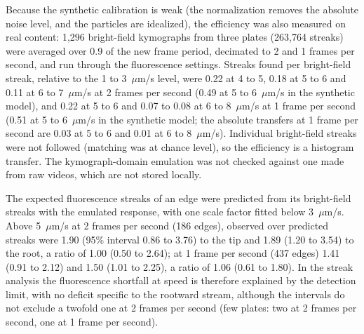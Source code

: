 Because the synthetic calibration is weak (the normalization removes the absolute noise level, and the particles are idealized), the efficiency was also measured on real content: 1,296 bright-field kymographs from three plates (263,764 streaks) were averaged over 0.9 of the new frame period, decimated to 2 and 1 frames per second, and run through the fluorescence settings.
Streaks found per bright-field streak, relative to the 1 to 3~$\mu$m/s level, were 0.22 at 4 to 5, 0.18 at 5 to 6 and 0.11 at 6 to 7~$\mu$m/s at 2 frames per second (0.49 at 5 to 6~$\mu$m/s in the synthetic model), and 0.22 at 5 to 6 and 0.07 to 0.08 at 6 to 8~$\mu$m/s at 1 frame per second (0.51 at 5 to 6~$\mu$m/s in the synthetic model; the absolute transfers at 1 frame per second are 0.03 at 5 to 6 and 0.01 at 6 to 8~$\mu$m/s).
Individual bright-field streaks were not followed (matching was at chance level), so the efficiency is a histogram transfer.
The kymograph-domain emulation was not checked against one made from raw videos, which are not stored locally.

The expected fluorescence streaks of an edge were predicted from its bright-field streaks with the emulated response, with one scale factor fitted below 3~$\mu$m/s.
Above 5~$\mu$m/s at 2 frames per second (186 edges), observed over predicted streaks were 1.90 (95\% interval 0.86 to 3.76) to the tip and 1.89 (1.20 to 3.54) to the root, a ratio of 1.00 (0.50 to 2.64); at 1 frame per second (437 edges) 1.41 (0.91 to 2.12) and 1.50 (1.01 to 2.25), a ratio of 1.06 (0.61 to 1.80).
In the streak analysis the fluorescence shortfall at speed is therefore explained by the detection limit, with no deficit specific to the rootward stream, although the intervals do not exclude a twofold one at 2 frames per second (few plates: two at 2 frames per second, one at 1 frame per second).

